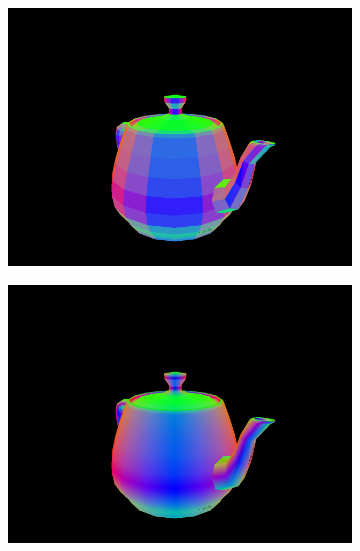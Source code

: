 \documentclass{article}
\begin{document}
\begin{figure}[hb]
  \begin{subfigure}{0.45\textwidth}
    \includegraphics[width=1\textwidth]{images/normal1.png}
  \end{subfigure}
  \begin{subfigure}{0.45\textwidth}
    \includegraphics[width=1\textwidth]{images/normal2.png}
  \end{subfigure}


\end{figure}
\end{document}
